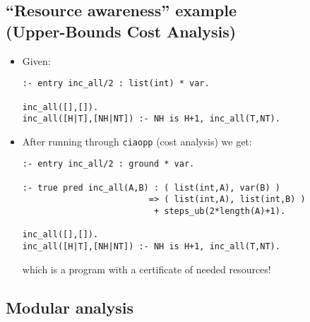 \documentclass{article}
\renewcommand{\_}{\char'137}
\begin{document}
\subsection{``Resource awareness'' example \\ (Upper-Bounds Cost Analysis)}

\begin{itemize}
\item Given:
\begin{verbatim}
:- entry inc_all/2 : list(int) * var.

inc_all([],[]).
inc_all([H|T],[NH|NT]) :- NH is H+1, inc_all(T,NT).
\end{verbatim}

\item After running through \texttt{ciaopp} (cost analysis) we get:
\begin{verbatim}
:- entry inc_all/2 : ground * var.

:- true pred inc_all(A,B) : ( list(int,A), var(B) )
                         => ( list(int,A), list(int,B) )
                          + steps_ub(2*length(A)+1).

inc_all([],[]).
inc_all([H|T],[NH|NT]) :- NH is H+1, inc_all(T,NT).
\end{verbatim}
which is a program with a certificate of needed resources!
\end{itemize}

\subsection{Modular analysis}
\end{document}
